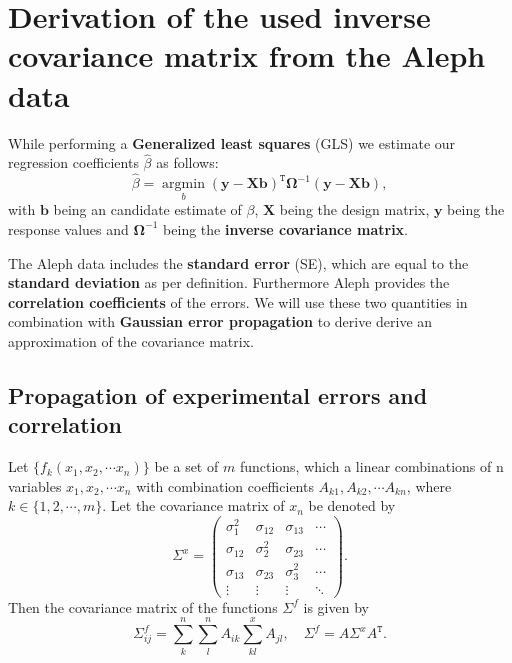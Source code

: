 \documentclass[../../index.tex]{subfiles}
\begin{document}
  \chapter{Derivation of the used inverse covariance matrix from the Aleph
    data}
  While performing a \textbf{Generalized least squares} (GLS) we estimate our
  regression coefficients $\hat\beta$ as follows:
  \begin{equation}
    \hat\beta = \underset{b}{\operatorname {argmin}}(\mathbf{y} - \mathbf{X} \mathbf{b}
    )^{\mathtt{T}} \mathbf{\Omega}^{-1} (\mathbf{y} - \mathbf{X} \mathbf{b}),
  \end{equation}
  with $\mathbf{b}$ being an candidate estimate of $\beta$, $\mathbf{X}$ being the
  design matrix, $\mathbf{y}$ being the response values and
  $\mathbf{\Omega}^{-1}$ being the \textbf{inverse covariance matrix}.

  The Aleph data includes the \textbf{standard error} (SE), which
  are equal to the \textbf{standard deviation} as per definition. Furthermore
  Aleph provides the \textbf{correlation coefficients} of the errors. We will
  use these two quantities in combination with \textbf{Gaussian error
    propagation} to derive derive an approximation of the covariance matrix.

  \section{Propagation of experimental errors and correlation}
  Let $\{f_k(x_1, x_2, \cdots x_n)\}$ be a set of $m$ functions, which a linear
  combinations of n variables $x_1, x_2, \cdots x_n$ with combination
  coefficients $A_{k1}, A_{k2}, \cdots A_{kn}$, where $k \in \{1, 2, \cdots,
  m\}$. Let the covariance matrix of $x_n$ be denoted by
  \begin{equation}
    \Sigma^x =
    \begin{pmatrix}
      \sigma_{1}^2 & \sigma_{12}  & \sigma_{13}  & \cdots \\
      \sigma_{12}  & \sigma_{2}^2 & \sigma_{23}  & \cdots \\
      \sigma_{13}  & \sigma_{23}  & \sigma_{3}^2 & \cdots \\
      \vdots      & \vdots       & \vdots      &  \ddots
    \end{pmatrix}.
  \end{equation}
  Then the covariance matrix of the functions $\Sigma^f$ is given by
  \begin{equation}
    \Sigma_{ij}^f = \sum_k^n \sum_l^n A_{ik} \sum_{kl}^x A_{jl}, \quad \Sigma^f= A \Sigma^x A^{\mathtt{T}}.
  \end{equation}
\end{document}

